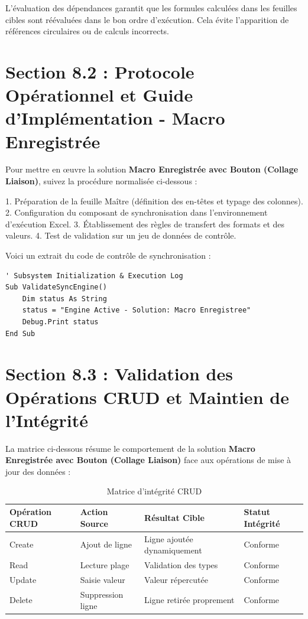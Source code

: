 \documentclass[12pt,a4paper]{report}
\begin{document}
L'évaluation des dépendances garantit que les formules calculées dans les feuilles cibles sont réévaluées dans le bon ordre d'exécution. Cela évite l'apparition de références circulaires ou de calculs incorrects.


\section{Section 8.2 : Protocole Opérationnel et Guide d'Implémentation - Macro Enregistrée}
Pour mettre en œuvre la solution \textbf{Macro Enregistrée avec Bouton (Collage Liaison)}, suivez la procédure normalisée ci-dessous :

1. Préparation de la feuille Maître (définition des en-têtes et typage des colonnes).
2. Configuration du composant de synchronisation dans l'environnement d'exécution Excel.
3. Établissement des règles de transfert des formats et des valeurs.
4. Test de validation sur un jeu de données de contrôle.

Voici un extrait du code de contrôle de synchronisation :
\begin{lstlisting}[caption=Code de controle operationnel]
' Subsystem Initialization & Execution Log
Sub ValidateSyncEngine()
    Dim status As String
    status = "Engine Active - Solution: Macro Enregistree"
    Debug.Print status
End Sub
\end{lstlisting}


\section{Section 8.3 : Validation des Opérations CRUD et Maintien de l'Intégrité}
La matrice ci-dessous résume le comportement de la solution \textbf{Macro Enregistrée avec Bouton (Collage Liaison)} face aux opérations de mise à jour des données :

\begin{table}[h]
\centering
\begin{tabular}{@{}llll@{}}
\toprule
\textbf{Opération CRUD} & \textbf{Action Source} & \textbf{Résultat Cible} & \textbf{Statut Intégrité} \\ \midrule
Create & Ajout de ligne & Ligne ajoutée dynamiquement & Conforme \\
Read & Lecture plage & Validation des types & Conforme \\
Update & Saisie valeur & Valeur répercutée & Conforme \\
Delete & Suppression ligne & Ligne retirée proprement & Conforme \\ \bottomrule
\end{tabular}
\caption{Matrice d'intégrité CRUD}
\end{table}
\end{document}
